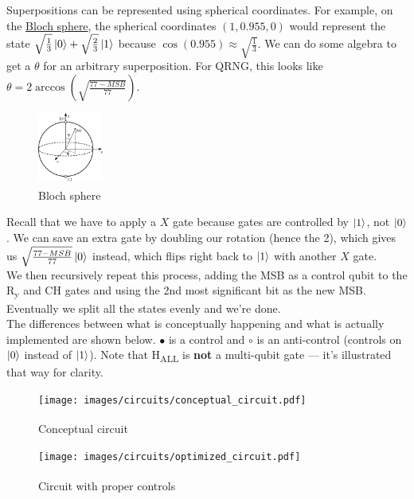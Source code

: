 \documentclass[12pt]{article}
\begin{document}
Superpositions can be represented using spherical coordinates. For example, on the \hyperref[fig:bsphere2]{Bloch sphere}, the spherical coordinates $(1, 0.955, 0)$ would represent the state $\sqrt{\frac{1}{3}} \ket{0} + \sqrt{\frac{2}{3}} \ket{1}$ because $\cos (0.955) \approx \sqrt{\frac{1}{3}}$. We can do some algebra to get a $\theta$ for an arbitrary superposition. For QRNG, this looks like $\theta = 2\arccos(\sqrt{\frac{77 - MSB}{77}})$. \\
\begin{figure}[H]
    \centering
    \capstart
    \includegraphics[width=0.19\textwidth]{images/bloch_sphere2.png}
    \caption{Bloch sphere\textsuperscript{\cite{wikipedia_2021}}}
    \label{fig:bsphere2}
\end{figure}
\noindent Recall that we have to apply a $X$ gate because gates are controlled by $\ket{1}$, not $\ket{0}$. We can save an extra gate by doubling our rotation (hence the 2), which gives us $\sqrt{\frac{77 - MSB}{77}} \ket{0}$ instead, which flips right back to $\ket{1}$ with another $X$ gate. \\
\indent We then recursively repeat this process, adding the MSB as a control qubit to the R\textsubscript{y} and CH gates and using the 2nd most significant bit as the new MSB. Eventually we split all the states evenly and we're done. \\

\noindent The differences between what is conceptually happening and what is actually implemented are shown below. $\bullet$ is a control and $\circ$ is an anti-control (controls on $\ket{0}$ instead of $\ket{1}$). Note that H\textsubscript{ALL} is \textbf{not} a multi-qubit gate --- it's illustrated that way for clarity.
\begin{figure}[H]
    \centering
    \texttt{[image: images/circuits/conceptual\_circuit.pdf]}
    \caption{Conceptual circuit\textsuperscript{\cite{chuang}}}
    \vspace{10mm}
    \texttt{[image: images/circuits/optimized\_circuit.pdf]}
    \caption{Circuit with proper controls\textsuperscript{\cite{chuang}}}
    \label{fig:circs}
\end{figure}
\end{document}
